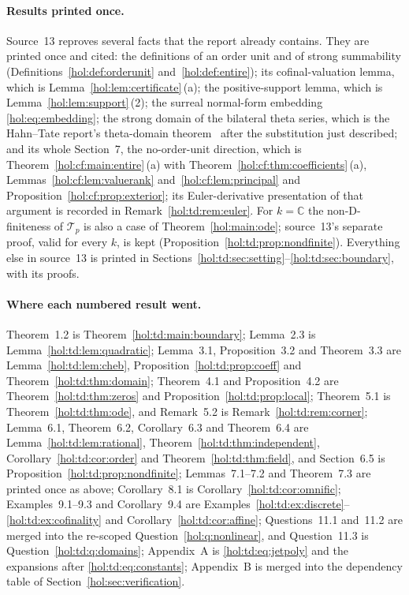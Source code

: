 \documentclass[11pt]{article}
\numberwithin{equation}{section}
\theoremstyle{definition}
\theoremstyle{remark}
\newcommand{\C}{\mathbb C}
\begin{document}
\paragraph{Results printed once.}
Source~13 reproves several facts that the report already contains. They are
printed once and cited: the definitions of an order unit and of strong
summability (Definitions~\ref{hol:def:orderunit} and~\ref{hol:def:entire});
its cofinal-valuation lemma, which is Lemma~\ref{hol:lem:certificate}\,(a);
the positive-support lemma, which is Lemma~\ref{hol:lem:support}\,(2); the
surreal normal-form embedding \eqref{hol:eq:embedding}; the strong domain of
the bilateral theta series, which is the Hahn--Tate report's theta-domain
theorem~\cite[\texttt{tate:thm:theta}]{repotate} after the substitution just
described; and its whole Section~7, the no-order-unit direction, which is
Theorem~\ref{hol:cf:main:entire}\,(a) with
Theorem~\ref{hol:cf:thm:coefficients}\,(a),
Lemmas~\ref{hol:cf:lem:valuerank} and~\ref{hol:cf:lem:principal} and
Proposition~\ref{hol:cf:prop:exterior}; its Euler-derivative presentation of
that argument is recorded in Remark~\ref{hol:td:rem:euler}. For $k=\C$ the
non-D-finiteness of $\mathcal T_p$ is also a case of
Theorem~\ref{hol:main:ode}; source~13's separate proof, valid for every $k$,
is kept (Proposition~\ref{hol:td:prop:nondfinite}). Everything else in
source~13 is printed in
Sections~\ref{hol:td:sec:setting}--\ref{hol:td:sec:boundary}, with its
proofs.

\paragraph{Where each numbered result went.}
Theorem~1.2 is Theorem~\ref{hol:td:main:boundary};
Lemma~2.3 is Lemma~\ref{hol:td:lem:quadratic}; Lemma~3.1,
Proposition~3.2 and Theorem~3.3 are Lemma~\ref{hol:td:lem:cheb},
Proposition~\ref{hol:td:prop:coeff} and Theorem~\ref{hol:td:thm:domain};
Theorem~4.1 and Proposition~4.2 are Theorem~\ref{hol:td:thm:zeros} and
Proposition~\ref{hol:td:prop:local}; Theorem~5.1 is
Theorem~\ref{hol:td:thm:ode}, and Remark~5.2 is
Remark~\ref{hol:td:rem:corner}; Lemma~6.1, Theorem~6.2, Corollary~6.3 and
Theorem~6.4 are Lemma~\ref{hol:td:lem:rational},
Theorem~\ref{hol:td:thm:independent}, Corollary~\ref{hol:td:cor:order} and
Theorem~\ref{hol:td:thm:field}, and Section~6.5 is
Proposition~\ref{hol:td:prop:nondfinite}; Lemmas~7.1--7.2 and Theorem~7.3 are
printed once as above; Corollary~8.1 is Corollary~\ref{hol:td:cor:omnific};
Examples~9.1--9.3 and Corollary~9.4 are
Examples~\ref{hol:td:ex:discrete}--\ref{hol:td:ex:cofinality} and
Corollary~\ref{hol:td:cor:affine}; Questions~11.1 and~11.2 are merged into the
re-scoped Question~\ref{hol:q:nonlinear}, and Question~11.3 is
Question~\ref{hol:td:q:domains}; Appendix~A is
\eqref{hol:td:eq:jetpoly} and the expansions after
\eqref{hol:td:eq:constants}; Appendix~B is merged into the dependency table of
Section~\ref{hol:sec:verification}.
\end{document}
